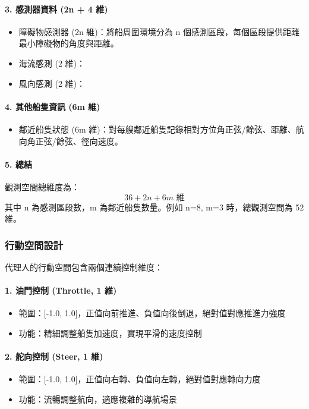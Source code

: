 \documentclass[12pt,a4paper]{article}
\begin{document}
\paragraph{3. 感測器資料 (2n + 4 維)}
\begin{itemize}
	\item 障礙物感測器 (2n 維)：將船周圍環境分為 n 個感測區段，每個區段提供距離最小障礙物的角度與距離。
	\item 海流感測 (2 維)：
	\item 風向感測 (2 維)：
\end{itemize}

\paragraph{4. 其他船隻資訊 (6m 維)}
\begin{itemize}
    \item 鄰近船隻狀態 (6m 維)：對每艘鄰近船隻記錄相對方位角正弦/餘弦、距離、航向角正弦/餘弦、徑向速度。
\end{itemize}

\paragraph{5. 總結}
觀測空間總維度為：
\[
36 + 2n + 6m \text{ 維}
\]
其中 n 為感測區段數，m 為鄰近船隻數量。例如 n=8, m=3 時，總觀測空間為 52 維。

\newpage

\subsubsection{行動空間設計}
代理人的行動空間包含兩個連續控制維度：

\paragraph{1. 油門控制 (Throttle, 1 維)}
\begin{itemize}
\item 範圍：[-1.0, 1.0]，正值向前推進、負值向後倒退，絕對值對應推進力強度
\item 功能：精細調整船隻加速度，實現平滑的速度控制
\end{itemize}

\paragraph{2. 舵向控制 (Steer, 1 維)}
\begin{itemize}
\item 範圍：[-1.0, 1.0]，正值向右轉、負值向左轉，絕對值對應轉向力度
\item 功能：流暢調整航向，適應複雜的導航場景
\end{itemize}
\end{document}
